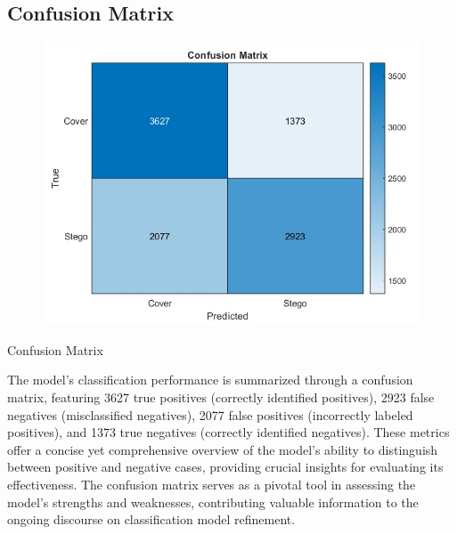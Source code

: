 \subsection{Confusion Matrix}
\begin{table}[H]
\begin{figure}[H]
    \centering
    \includegraphics[width=120mm]{./img/2600/consuse2600.jpg}
\end{figure}
\caption{Confusion Matrix}
\end{table}
The model's classification performance is summarized through a confusion matrix, featuring 3627 true positives (correctly identified positives), 2923 false negatives (misclassified negatives), 2077 false positives (incorrectly labeled positives), and 1373 true negatives (correctly identified negatives). These metrics offer a concise yet comprehensive overview of the model's ability to distinguish between positive and negative cases, providing crucial insights for evaluating its effectiveness. The confusion matrix serves as a pivotal tool in assessing the model's strengths and weaknesses, contributing valuable information to the ongoing discourse on classification model refinement.
